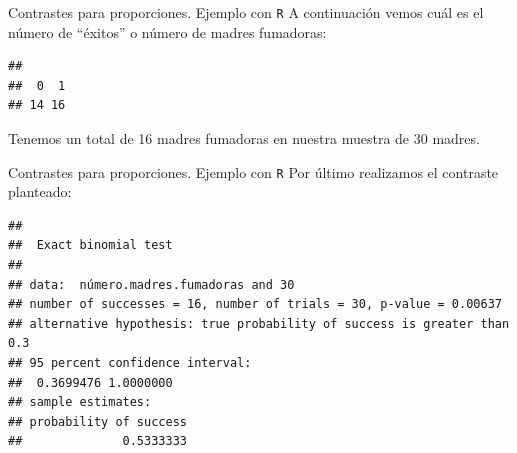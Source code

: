 \documentclass[
  ignorenonframetext,
]{beamer}
\newenvironment{Shaded}{\begin{snugshade}}{\end{snugshade}}
\newcommand{\DataTypeTok}[1]{\textcolor[rgb]{0.13,0.29,0.53}{#1}}
\newcommand{\DecValTok}[1]{\textcolor[rgb]{0.00,0.00,0.81}{#1}}
\newcommand{\FloatTok}[1]{\textcolor[rgb]{0.00,0.00,0.81}{#1}}
\newcommand{\KeywordTok}[1]{\textcolor[rgb]{0.13,0.29,0.53}{\textbf{#1}}}
\newcommand{\NormalTok}[1]{#1}
\newcommand{\OperatorTok}[1]{\textcolor[rgb]{0.81,0.36,0.00}{\textbf{#1}}}
\newcommand{\StringTok}[1]{\textcolor[rgb]{0.31,0.60,0.02}{#1}}
\begin{document}
\begin{frame}[fragile]{Contrastes para proporciones. Ejemplo con
\texttt{R}}
\protect\hypertarget{contrastes-para-proporciones.-ejemplo-con-r-3}{}
A continuación vemos cuál es el número de ``éxitos'' o número de madres
fumadoras:

\begin{Shaded}
\end{Shaded}

\begin{verbatim}
## 
##  0  1 
## 14 16
\end{verbatim}

Tenemos un total de 16 madres fumadoras en nuestra muestra de 30 madres.
\end{frame}

\begin{frame}[fragile]{Contrastes para proporciones. Ejemplo con
\texttt{R}}
\protect\hypertarget{contrastes-para-proporciones.-ejemplo-con-r-4}{}
Por último realizamos el contraste planteado:

\begin{Shaded}
\end{Shaded}

\begin{verbatim}
## 
##  Exact binomial test
## 
## data:  número.madres.fumadoras and 30
## number of successes = 16, number of trials = 30, p-value = 0.00637
## alternative hypothesis: true probability of success is greater than 0.3
## 95 percent confidence interval:
##  0.3699476 1.0000000
## sample estimates:
## probability of success 
##              0.5333333
\end{verbatim}
\end{frame}
\end{document}
